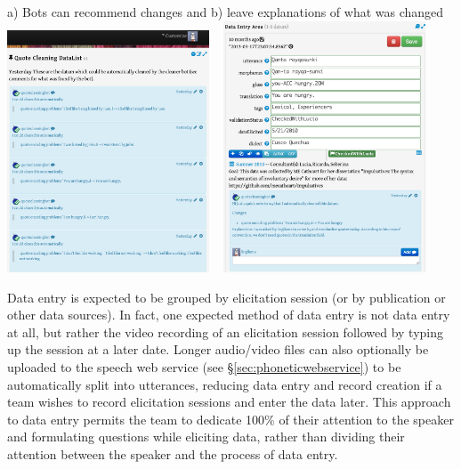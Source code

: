 \documentclass[letterpaper, 12pt, dvips]{mitwpl}
\begin{document}
\begin{exe} 
\ex a) Bots can recommend changes and b)  leave explanations of what was changed
\hspace{-1in}
 \centering
   \includegraphics[width=0.45\textwidth]{cleaningBotsDatalist} ~
   \includegraphics[width=0.45\textwidth]{cleaningBotCameBy}

\label{ex:bots}
\end{exe}



Data entry is expected to be grouped by elicitation session (or by publication or other data sources).
In fact,
one expected method of data entry is not data entry at all,
but rather the video recording of an elicitation session followed by typing up the session at a later date.
Longer audio/video files can also optionally be uploaded to the speech web service (see \S \ref{sec:phoneticwebservice}) to be automatically split into utterances,
 reducing data entry and record creation if a team wishes to record elicitation sessions and enter the data later.
 This approach to data entry permits the team to dedicate 100\% of their attention to the speaker and formulating questions while eliciting data,
rather than dividing their attention between the speaker and the process of data entry.
\end{document}
